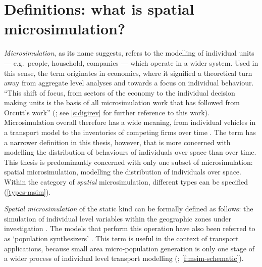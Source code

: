 
\section{Definitions: what is spatial microsimulation?}
\label{s:defs}
\emph{Microsimulation}, as its name suggests, refers to the modelling of
individual units --- e.g.~people, household, companies --- which operate in a
wider system. Used in this sense, the term originates in economics, where it
signified a theoretical turn away from aggregate level analyses and towards a
focus on individual behaviour. ``This shift of focus, from sectors of the
economy to the individual decision making units is the basis of all
microsimulation work that has followed from Orcutt's work''
(\citealp[p.~145]{Holm1987}; see \cref{s:digirev} for further reference to
this work). Microsimulation overall therefore has a wide meaning, from
individual vehicles in a transport model \citep{Liu2006, Ferguson2012}
to the inventories of
competing firms over time \citep{Bergmann1990a}.
The term has a narrower definition in this
thesis, however, that is more concerned with modelling the distribution of
behaviours of individuals over space than over time. This thesis is predominantly
concerned with only one subset of microsimulation: spatial
microsimulation, modelling the distribution of individuals over
space. Within the category of \emph{spatial} microsimulation, different types
can be specified (\cref{types-msim}).

\emph{Spatial microsimulation} of the static kind can be formally
defined as
follows: the simulation of individual level variables within the geographic
zones under investigation \citep{ballas2003microsimulation-30-years, Ballas2007simb}.
The models that perform this operation have also
been referred to as `population synthesizers' \citep{Mohammadian2010}. This
term is useful in the context of transport applications, because small area
micro-population generation is only one stage of a wider process of
individual level transport modelling (\citealp{Pritchard2012}; \cref{f:msim-schematic}).

